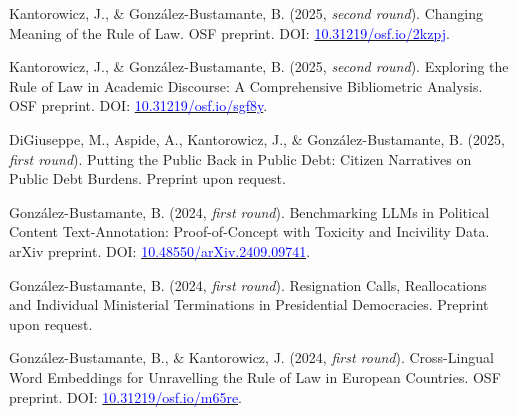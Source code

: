 \begin{publications}

\begin{benumerate}{7}


\item{Kantorowicz, J., \& González-Bustamante, B. (2025, {\itshape second round}). Changing Meaning of the Rule of Law. OSF preprint. DOI: \href{https://doi.org/10.31219/osf.io/2kzpj}{\textcolor{blue}{10.31219/osf.io/2kzpj}}.}\vspace{1mm}

\item{Kantorowicz, J., \& González-Bustamante, B. (2025, {\itshape second round}). Exploring the Rule of Law in Academic Discourse: A Comprehensive Bibliometric Analysis. OSF preprint. DOI: \href{https://doi.org/10.31219/osf.io/sgf8y}{\textcolor{blue}{10.31219/osf.io/sgf8y}}.}\vspace{1mm}

\item{DiGiuseppe, M., Aspide, A., Kantorowicz, J., \& González-Bustamante, B. (2025, {\itshape first round}). Putting the Public Back in Public Debt: Citizen Narratives on Public Debt Burdens. Preprint upon request.}\vspace{1mm}

\item{González-Bustamante, B. (2024, {\itshape first round}). Benchmarking LLMs in Political Content Text-Annotation: Proof-of-Concept with Toxicity and Incivility Data. arXiv preprint. DOI: \href{https://doi.org/10.48550/arXiv.2409.09741}{\textcolor{blue}{10.48550/arXiv.2409.09741}}.}\vspace{1mm}

\item{González-Bustamante, B. (2024, {\itshape first round}). Resignation Calls, Reallocations and Individual Ministerial Terminations in Presidential Democracies. Preprint upon request.}\vspace{1mm} %

\item{González-Bustamante, B., \& Kantorowicz, J. (2024, {\itshape first round}). Cross-Lingual Word Embeddings for Unravelling the Rule of Law in European Countries. OSF preprint. DOI: \href{https://doi.org/10.31219/osf.io/m65re}{\textcolor{blue}{10.31219/osf.io/m65re}}.}\vspace{1mm}


\end{benumerate}
\end{publications}
